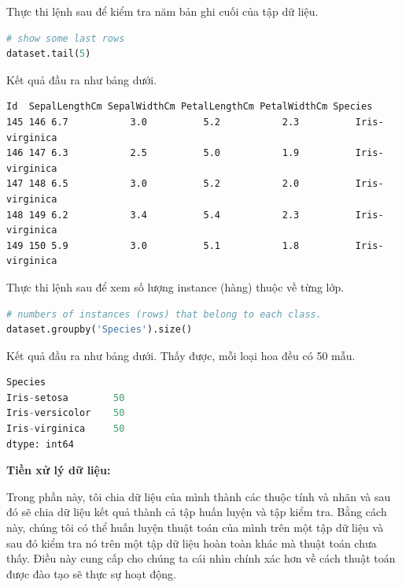 Thực thi lệnh sau để kiểm tra năm bản ghi cuối của tập dữ liệu.

\begin{center}
\begin{lstlisting}[language=Python,breaklines=true]
# show some last rows
dataset.tail(5)
\end{lstlisting}
\end{center}

Kết quả đầu ra như bảng dưới.

\begin{center}
\begin{lstlisting}[basicstyle=\fontsize{9}{13}\selectfont\ttfamily]
    Id  SepalLengthCm SepalWidthCm PetalLengthCm PetalWidthCm Species
145 146 6.7           3.0          5.2           2.3          Iris-virginica
146 147 6.3           2.5          5.0           1.9          Iris-virginica
147 148 6.5           3.0          5.2           2.0          Iris-virginica
148 149 6.2           3.4          5.4           2.3          Iris-virginica
149 150 5.9           3.0          5.1           1.8          Iris-virginica
\end{lstlisting}
\end{center}

Thực thi lệnh sau để xem số lượng instance (hàng) thuộc về từng lớp.

\begin{center}
\begin{lstlisting}[language=Python,breaklines=true]
# numbers of instances (rows) that belong to each class. 
dataset.groupby('Species').size()
\end{lstlisting}
\end{center}

Kết quả đầu ra như bảng dưới. Thấy được, mỗi loại hoa đều có 50 mẫu.

\begin{center}
\begin{lstlisting}[language=Python,breaklines=true]
Species
Iris-setosa        50
Iris-versicolor    50
Iris-virginica     50
dtype: int64
\end{lstlisting}
\end{center}

\textbf{Tiền xử lý dữ liệu:}

Trong phần này, tôi chia dữ liệu của mình thành các thuộc tính và nhãn và sau đó sẽ chia dữ liệu kết quả thành cả tập huấn luyện và tập kiểm tra. Bằng cách này, chúng tôi có thể huấn luyện thuật toán của mình trên một tập dữ liệu và sau đó kiểm tra nó trên một tập dữ liệu hoàn toàn khác mà thuật toán chưa thấy. Điều này cung cấp cho chúng ta cái nhìn chính xác hơn về cách thuật toán được đào tạo sẽ thực sự hoạt động.\\

